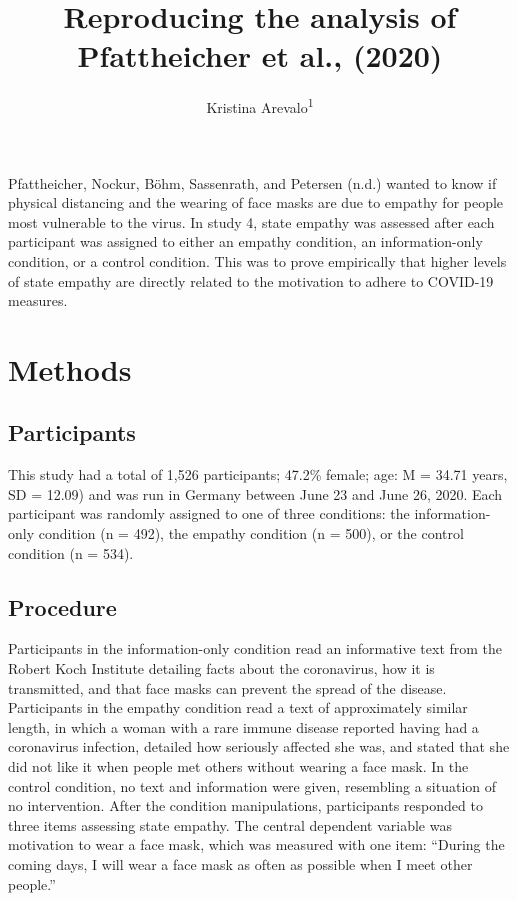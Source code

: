 \documentclass[
  english,
  man]{apa6}
\title{Reproducing the analysis of Pfattheicher et al., (2020)}
\author{Kristina Arevalo\textsuperscript{1}}
\date{}
\affiliation{\vspace{0.5cm}\textsuperscript{1} Brooklyn College of the City University of New York}
\begin{document}
\maketitle

Pfattheicher, Nockur, Böhm, Sassenrath, and Petersen (n.d.) wanted to know if physical distancing and the wearing of face masks are due to empathy for people most vulnerable to the virus. In study 4, state empathy was assessed after each participant was assigned to either an empathy condition, an information-only condition, or a control condition. This was to prove empirically that higher levels of state empathy are directly related to the motivation to adhere to COVID-19 measures.

\newpage

\hypertarget{methods}{%
\section{Methods}\label{methods}}

\hypertarget{participants}{%
\subsection{Participants}\label{participants}}

This study had a total of 1,526 participants; 47.2\% female; age: M = 34.71 years, SD = 12.09) and was run in Germany between June 23 and June 26, 2020. Each participant was randomly assigned to one of three conditions: the information-only condition (n = 492), the empathy condition (n = 500), or the control condition (n = 534).

\hypertarget{procedure}{%
\subsection{Procedure}\label{procedure}}

Participants in the information-only condition read an informative text from the Robert Koch Institute detailing facts about the coronavirus, how it is transmitted, and that face masks can prevent the spread of the disease. Participants in the empathy condition read a text of approximately similar length, in which a woman with a rare immune disease reported having had a coronavirus infection, detailed how seriously affected she was, and stated that she did not like it when people met others without wearing a face mask. In the control condition, no text and information were given, resembling a situation of no intervention. After the condition manipulations, participants responded to three items assessing state empathy. The central dependent variable was motivation to wear a face mask, which was measured with one item: \enquote{During the coming days, I will wear a face mask as often as possible when I meet other people.}
\end{document}
